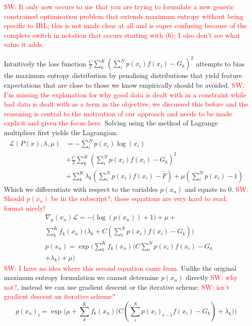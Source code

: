 \documentclass[letterpaper]{article}
\newcommand{\sw}[1]{\textcolor{red}{SW: #1}}
\begin{document}
	\sw{It only now occurs to me that you are trying to formulate a new generic constrained optimisation problem that extends maximum entropy without being specific to IRL; this is not made clear at all and is super confusing because of the complete switch in notation that occurs starting with (6); I also don't see what value it adds.}

	Intuitively the loss function $\frac{C}{2}\sum_k^K(\sum_i^N p(x_i)f(x_i) - G_k)^2$ attempts to bias the 
	maximum entropy distribution by penalising distributions that yield feature expectations that are close 
	to those we know empirically should be avoided. \sw{I'm missing the explanation for why good data is dealt with in a constraint while bad data is dealt with as a term in the objective; we discussed this before and the reasoning is central to the motivation of our approach and needs to be made explicit and given the focus here.}
	Solving using the method of Lagrange multipliers first yields the Lagrangian.
\begin{equation}
	\begin{split}
	\mathcal{L}(P(x),\lambda,\mu) &=  -\sum_i^N p(x_i)\log(x_i) \\
	&+\frac{C}{2}\sum_k^K(\sum_i^N p(x_i)f(x_i) - G_k)^2\\
	 & + \sum_k^K\lambda_k(\sum_i^N p(x_i)f(x_i) - \widetilde{F}) + \mu(\sum_i^N p(x_i) - 1)
	\end{split}
\end{equation}
Which we differentiate with respect to the variables $p(x_n)$ and equate to 0.
\sw{Should $p(x_n)$ be in the subscript?; these equations are very hard to read: format nicely!}
\begin{equation}
	\begin{split}
	&\nabla_p(x_n)\mathcal{L} =  -\big(\log(p(x_n))+1\big) +\mu + \\
	&\sum_k^K f_k(x_n)\big(\lambda_k+C(\sum_i^N p(x_i)f(x_i) - G_k)\big)\\
	&p(x_n) =\exp \Big( \sum_k^Kf_k(x_n)\big(C\sum_i^N p(x_i)f(x_i) - G_k\\
	&+\lambda_k\big) + \mu \Big)
	\end{split}
\end{equation}
\sw{I have no idea where this second equation came from.}
Unlike the original maximum entropy formulation we cannot determine $p(x_n)$ directly \sw{why not?}, instead 
we can use gradient descent or the iterative scheme: \sw{isn't gradient descent an iterative scheme?}
\begin{equation}
p(x_n)_t =\exp \Big(\mu+ \sum_k^Kf_k(x_n)\big( C(\sum_i^N p(x_i)_{t-1}f(x_i) - G_k)+\lambda_k\big)\Big) \label{eqn:iter_scheme}
\end{equation}
\end{document}

